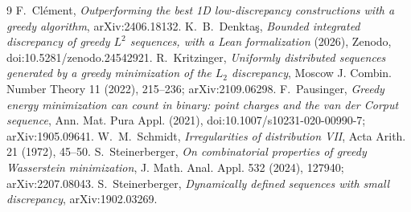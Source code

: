 \documentclass[11pt]{amsart}
\theoremstyle{remark}
\begin{document}
\begin{thebibliography}{9}
 F.~Cl\'ement, \emph{Outperforming the best 1D low-discrepancy
constructions with a greedy algorithm}, arXiv:2406.18132.
 K.~B.~Denkta\c{s}, \emph{Bounded integrated discrepancy of greedy
$L^2$ sequences, with a Lean formalization} (2026), Zenodo,
doi:10.5281/zenodo.24542921.
 R.~Kritzinger, \emph{Uniformly distributed sequences generated by
a greedy minimization of the $L_2$ discrepancy}, Moscow J. Combin. Number
Theory 11 (2022), 215--236; arXiv:2109.06298.
 F.~Pausinger, \emph{Greedy energy minimization can count in binary:
point charges and the van der Corput sequence}, Ann. Mat. Pura Appl. (2021),
doi:10.1007/s10231-020-00990-7; arXiv:1905.09641.
 W.~M.~Schmidt, \emph{Irregularities of distribution VII}, Acta
Arith. 21 (1972), 45--50.
 S.~Steinerberger, \emph{On combinatorial properties of greedy
Wasserstein minimization}, J. Math. Anal. Appl. 532 (2024), 127940;
arXiv:2207.08043.
 S.~Steinerberger, \emph{Dynamically defined sequences with small
discrepancy}, arXiv:1902.03269.
\end{thebibliography}
\end{document}
